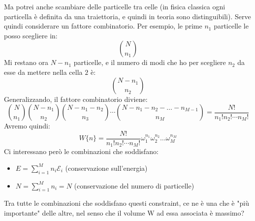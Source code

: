 \documentclass[../MeccanicaStatistica.tex]{subfiles}
\begin{document}
Ma potrei anche scambiare delle particelle tra celle (in fisica classica ogni particella è definita da una traiettoria, e quindi in teoria sono distinguibili). Serve quindi considerare un fattore combinatorio.
Per esempio, le prime $n_1$ particelle le posso scegliere in:
\[
\binom{N}{n_1}
\]
Mi restano ora $N-n_1$ particelle, e il numero di modi che ho per scegliere $n_2$ da esse da mettere nella cella $2$ è:
\[
\binom{N-n_1}{n_2}
\]
Generalizzando, il fattore combinatorio diviene:
\[
\binom{N}{n_1}\binom{N-n_1}{n_2}\binom{N-n_1-n_2}{n_3}\cdots\binom{N-n_1-n_2-\ldots-n_{M-1}}{n_M}=\frac{N!}{n_1!n_2!\cdots n_M!}
\]
Avremo quindi:
\[
W\{n\}=\frac{N!}{n_1!n_2!\cdots n_M!}\omega_1^{n_1}\omega_2^{n_2}\dots\omega_M^{n_M}
\]
Ci interessano però le combinazioni che soddisfano: 
\begin{itemize}
    \item $E= \sum_{i=1}^{M}{n_i\mathcal{E}_i}$  (conservazione sull'energia)
    \item $N= \sum_{i=1}^{M}{n_i=N}$  (conservazione del numero di particelle)
\end{itemize}
Tra tutte le combinazioni che soddisfano questi constraint, ce ne è una che è "più importante" delle altre, nel senso che il volume W ad essa associata è massimo?\\
\end{document}
